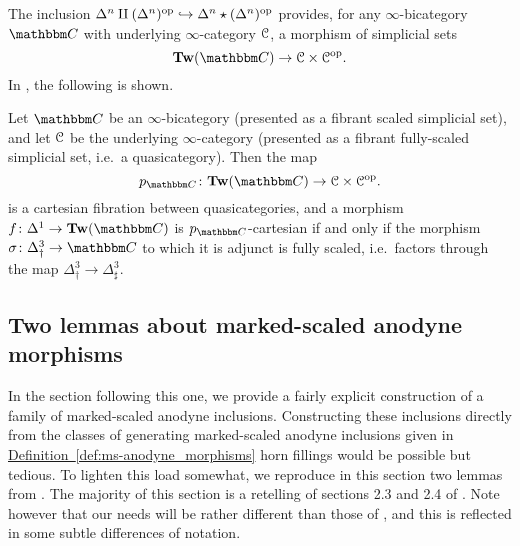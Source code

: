 \documentclass[main.tex]{subfiles}
\begin{document}
The inclusion $\Delta^{n} \amalg (\Delta^{n})^{\mathrm{op}} \hookrightarrow \Delta^{n} \star (\Delta^{n})^{\mathrm{op}}$ provides, for any $\infty$-bicategory $\CC$ with underlying $\infty$-category $\mathcal{C}$, a morphism of simplicial sets
\begin{equation*}
  \Tw(\CC) \to \category{C} \times \category{C}\op.
\end{equation*}
In \cite{garcia2020enhanced}, the following is shown.

\begin{theorem}
  \label{thm:mainthm_walker_fernando}
  Let $\CC$ be an $\infty$-bicategory (presented as a fibrant scaled simplicial set), and let $\mathcal{C}$ be the underlying $\infty$-category (presented as a fibrant fully-scaled simplicial set, i.e.\ a quasicategory). Then the map
  \begin{equation*}
    p_{\CC}\colon \Tw(\CC) \to \category{C} \times \category{C}\op.
  \end{equation*}
  is a cartesian fibration between quasicategories, and a morphism $f\colon \Delta^{1} \to \Tw(\CC)$ is $p_{\CC}$-cartesian if and only if the morphism $\sigma\colon \Delta^{3}_{\dagger} \to \CC$ to which it is adjunct is fully scaled, i.e.\ factors through the map $\Delta^{3}_{\dagger} \to \Delta^{3}_{\sharp}$.
\end{theorem}

%

\subsection{Two lemmas about marked-scaled anodyne morphisms}
\label{ssc:two_lemmas_about_marked_scaled_anodyne_morphisms}

In the section following this one, we provide a fairly explicit construction of a family of marked-scaled anodyne inclusions. Constructing these inclusions directly from the classes of generating marked-scaled anodyne inclusions given in \hyperref[def:ms-anodyne_morphisms]{Definition~\ref*{def:ms-anodyne_morphisms}} horn fillings would be possible but tedious. To lighten this load somewhat, we reproduce in this section two lemmas from \cite{garcia2cartesianfibrationsii}. The majority of this section is a retelling of sections 2.3 and 2.4 of \cite{garcia2cartesianfibrationsii}. Note however that our needs will be rather different than those of \cite{garcia2cartesianfibrationsii}, and this is reflected in some subtle differences of notation.
\end{document}
